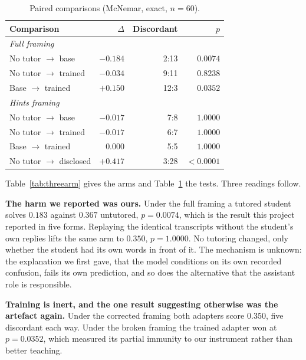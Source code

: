 \documentclass[conference]{IEEEtran}
\begin{document}
\begin{table}[t]
\caption{Paired comparisons (McNemar, exact, $n{=}60$).}
\label{tab:mcnemar}
\centering
\small
\begin{tabular}{lrrr}
\toprule
\textbf{Comparison} & \textbf{$\Delta$} & \textbf{Discordant} & \textbf{$p$} \\
\midrule
\multicolumn{4}{l}{\emph{Full framing}} \\
No tutor $\rightarrow$ base     & $-0.184$ & 2:13  & $\mathbf{0.0074}$ \\
No tutor $\rightarrow$ trained  & $-0.034$ & 9:11  & $0.8238$ \\
Base $\rightarrow$ trained      & $+0.150$ & 12:3  & $\mathbf{0.0352}$ \\
\midrule
\multicolumn{4}{l}{\emph{Hints framing}} \\
No tutor $\rightarrow$ base     & $-0.017$ & 7:8   & $1.0000$ \\
No tutor $\rightarrow$ trained  & $-0.017$ & 6:7   & $1.0000$ \\
Base $\rightarrow$ trained      & $0.000$  & 5:5   & $1.0000$ \\
\midrule
No tutor $\rightarrow$ disclosed & $+0.417$ & 3:28 & $\mathbf{<0.0001}$ \\
\bottomrule
\end{tabular}
\end{table}

Table~\ref{tab:threearm} gives the arms and Table~\ref{tab:mcnemar} the tests.
Three readings follow.

\textbf{The harm we reported was ours.} Under the full framing a tutored
student solves $0.183$ against $0.367$ untutored, $p{=}0.0074$, which is the
result this project reported in five forms. Replaying the identical transcripts
without the student's own replies lifts the same arm to $0.350$, $p{=}1.0000$.
No tutoring changed, only whether the student had its own words in front of it.
The mechanism is unknown: the explanation we first gave, that the model
conditions on its own recorded confusion, fails its own prediction, and so does
the alternative that the assistant role is responsible.

\textbf{Training is inert, and the one result suggesting otherwise was the
artefact again.} Under the corrected framing both adapters score $0.350$, five
discordant each way. Under the broken framing the trained adapter won at
$p{=}0.0352$, which measured its partial immunity to our instrument rather than
better teaching.
\end{document}
